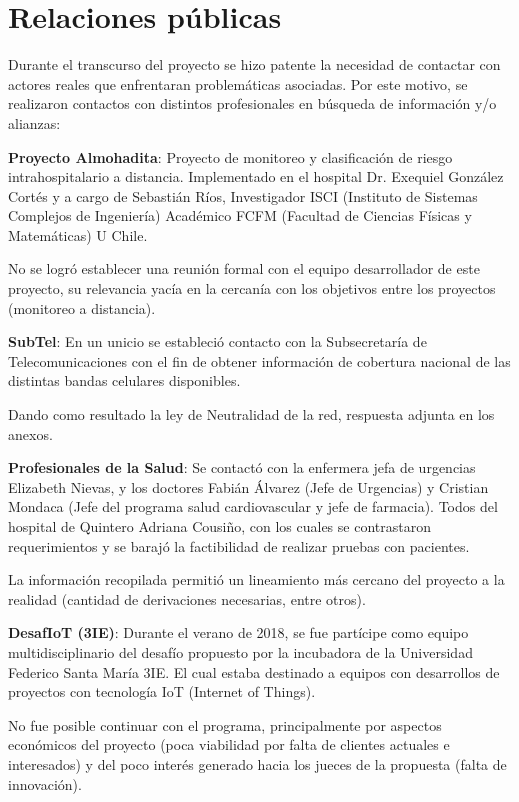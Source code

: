 \section{Relaciones públicas}

Durante el transcurso del proyecto se hizo patente la necesidad de contactar con actores reales que enfrentaran problemáticas asociadas. Por este motivo, se realizaron contactos con distintos profesionales en búsqueda de información y/o alianzas:

\textbf{Proyecto Almohadita}: Proyecto de monitoreo y clasificación de riesgo intrahospitalario a distancia. Implementado en el hospital Dr. Exequiel González Cortés y a cargo de Sebastián Ríos, Investigador ISCI (Instituto de Sistemas Complejos de Ingeniería) Académico FCFM (Facultad de Ciencias Físicas y Matemáticas) U Chile. 

No se logró establecer una reunión formal con el equipo desarrollador de este proyecto, su relevancia yacía en la cercanía con los objetivos entre los proyectos (monitoreo a distancia).

\textbf{SubTel}: En un unicio se estableció contacto con la Subsecretaría de Telecomunicaciones con el fin de obtener información de cobertura nacional de las distintas bandas celulares disponibles. 

Dando como resultado la ley de Neutralidad de la red, respuesta adjunta en los anexos.

\newpage

\textbf{Profesionales de la Salud}: Se contactó con la enfermera jefa de urgencias Elizabeth Nievas, y los doctores Fabián Álvarez (Jefe de Urgencias) y Cristian Mondaca (Jefe del programa salud cardiovascular y jefe de farmacia). Todos del hospital de Quintero Adriana Cousiño, con los cuales se contrastaron requerimientos y se barajó la factibilidad de realizar pruebas con pacientes.

La información recopilada permitió un lineamiento más cercano del proyecto a la realidad (cantidad de derivaciones necesarias, entre otros).

\textbf{DesafIoT (3IE)}: Durante el verano de 2018, se fue partícipe como equipo multidisciplinario del desafío propuesto por la incubadora de la Universidad Federico Santa María 3IE. El cual estaba destinado a equipos con desarrollos de proyectos con tecnología IoT (Internet of Things). 

No fue posible continuar con el programa, principalmente por aspectos económicos del proyecto (poca viabilidad por falta de clientes actuales e interesados) y del poco interés generado hacia los jueces de la propuesta (falta de innovación).

